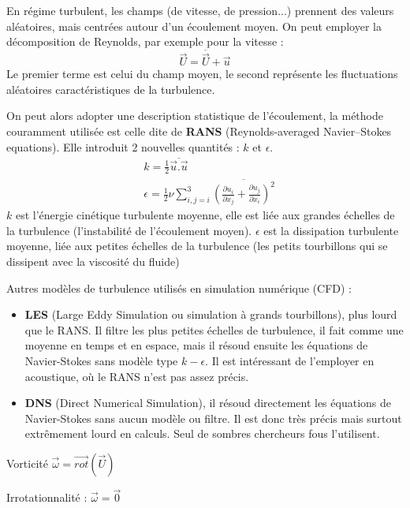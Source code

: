 En régime turbulent, les champs (de vitesse, de pression...) prennent des valeurs aléatoires, mais centrées autour d'un écoulement moyen. On peut employer la décomposition de Reynolds, par exemple pour la vitesse :
%
\begin{equation}
\vec{U} = \overline{\vec{U}} + \vec{u}
\end{equation}
%
Le premier terme est celui du champ moyen, le second représente les fluctuations aléatoires caractéristiques de la turbulence.

On peut alors adopter une description statistique de l'écoulement, la méthode couramment utilisée est celle dite de \textbf{RANS} (Reynolds-averaged Navier–Stokes equations). Elle introduit 2 nouvelles quantités : $k$ et $\epsilon$.
%
\begin{align}
 & k = \frac{1}{2} \overline{\vec{u}.\vec{u}} \\
 & \epsilon = \frac{1}{2} \nu \sum\limits_{i,j=i}^3 \overline{\left(
 \frac{ \partial u_i }{ \partial x_j }
 + \frac{ \partial u_j }{ \partial x_i } \right)^2}
\end{align}
%
$k$ est l'énergie cinétique turbulente moyenne, elle est liée aux grandes échelles de la turbulence (l'instabilité de l'écoulement moyen). $\epsilon$ est la dissipation turbulente moyenne, liée aux petites échelles de la turbulence (les petits tourbillons qui se dissipent avec la viscosité du fluide)

Autres modèles de turbulence utilisés en simulation numérique (CFD) :
%
\begin{itemize}
    \item \textbf{LES} (Large Eddy Simulation ou simulation à grands tourbillons), plus lourd que le RANS. Il filtre les plus petites échelles de turbulence, il fait comme une moyenne en temps et en espace, mais il résoud ensuite les équations de Navier-Stokes sans modèle type $k-\epsilon$. Il est intéressant de l'employer en acoustique, où le RANS n'est pas assez précis.
    \item \textbf{DNS} (Direct Numerical Simulation), il résoud directement les équations de Navier-Stokes sans aucun modèle ou filtre. Il est donc très précis mais surtout extrêmement lourd en calculs. Seul de sombres chercheurs fous l'utilisent.
\end{itemize}

Vorticité $\vec{\omega}=\vec{rot}(\vec{U})$

Irrotationnalité : $\vec{\omega}=\vec{0}$
